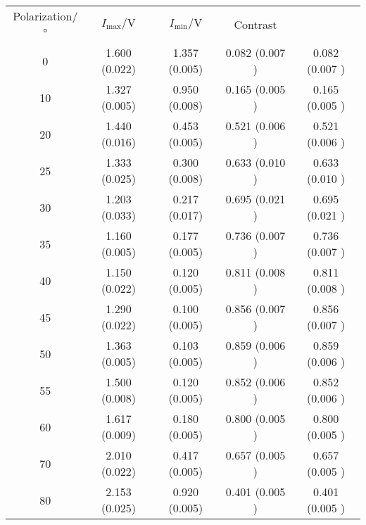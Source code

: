 \begin{table}[H]
	\centering
	\begin{tabular}{S S S S S}
		{Polarization/\unit{\degree}} & {$I_\text{max}/\unit{\volt}$} & {$I_\text{min}/\unit{\volt}$} & {Contrast}                       \\
		0                             & 1.600 (0.022)                 & 1.357 (0.005)                 & 0.082 (0.007 ) & 0.082 (0.007 )  \\
		10                            & 1.327 (0.005)                 & 0.950 (0.008)                 & 0.165 (0.005 ) & 0.165 (0.005 )  \\
		20                            & 1.440 (0.016)                 & 0.453 (0.005)                 & 0.521 (0.006 ) & 0.521 (0.006 )  \\
		25                            & 1.333 (0.025)                 & 0.300 (0.008)                 & 0.633 (0.010 ) & 0.633 (0.010 )  \\
		30                            & 1.203 (0.033)                 & 0.217 (0.017)                 & 0.695 (0.021 ) & 0.695 (0.021 )  \\
		35                            & 1.160 (0.005)                 & 0.177 (0.005)                 & 0.736 (0.007 ) & 0.736 (0.007 )  \\
		40                            & 1.150 (0.022)                 & 0.120 (0.005)                 & 0.811 (0.008 ) & 0.811 (0.008 )  \\
		45                            & 1.290 (0.022)                 & 0.100 (0.005)                 & 0.856 (0.007 ) & 0.856 (0.007 )  \\
		50                            & 1.363 (0.005)                 & 0.103 (0.005)                 & 0.859 (0.006 ) & 0.859 (0.006 )  \\
		55                            & 1.500 (0.008)                 & 0.120 (0.005)                 & 0.852 (0.006 ) & 0.852 (0.006 )  \\
		60                            & 1.617 (0.009)                 & 0.180 (0.005)                 & 0.800 (0.005 ) & 0.800 (0.005 )  \\
		70                            & 2.010 (0.022)                 & 0.417 (0.005)                 & 0.657 (0.005 ) & 0.657 (0.005 )  \\
		80                            & 2.153 (0.025)                 & 0.920 (0.005)                 & 0.401 (0.005 ) & 0.401 (0.005 )  \\

\end{tabular}
\end{table}
